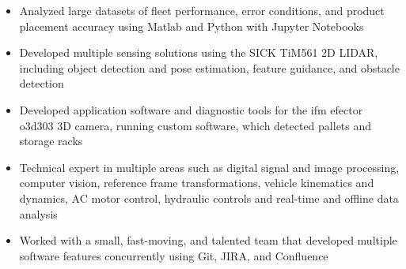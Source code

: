 	\begin{itemize} [leftmargin = \itemmargin]
		\item Analyzed large datasets of fleet performance, error conditions, and product placement accuracy using Matlab and Python with Jupyter Notebooks
				
		\item Developed multiple sensing solutions using the SICK TiM561 2D LIDAR, including object detection and pose estimation, feature guidance, and obstacle detection

		\item Developed application software and diagnostic tools for the ifm efector o3d303 3D camera, running custom software, which detected pallets and storage racks

		\item Technical expert in multiple areas such as digital signal and image processing, computer vision, reference frame transformations, 
		vehicle kinematics and dynamics, AC motor control, hydraulic controls and real-time and offline data analysis
		
		\item Worked with a small, fast-moving, and talented team that developed multiple software features concurrently using Git, JIRA, and Confluence
		
	\end{itemize} \\